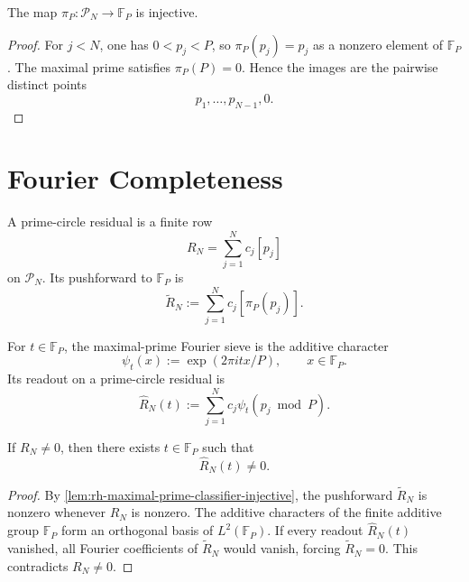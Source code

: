 \begin{lemma}
\label{lem:rh-maximal-prime-classifier-injective}
The map $\pi_P:\mathcal P_N\to\mathbb F_P$ is injective.
\end{lemma}

\begin{proof}
For $j<N$, one has $0<p_j<P$, so $\pi_P(p_j)=p_j$ as a nonzero element
of $\mathbb F_P$.  The maximal prime satisfies $\pi_P(P)=0$.  Hence the
images are the pairwise distinct points
$$
p_1,\ldots,p_{N-1},0.
$$
\end{proof}

\section{Fourier Completeness}
\label{sec:rh-finite-prime-circle-universe-fourier}

\begin{definition}
\label{def:rh-prime-circle-residual}
A prime-circle residual is a finite row
$$
R_N=\sum_{j=1}^{N}c_j[p_j]
$$
on $\mathcal P_N$.  Its pushforward to $\mathbb F_P$ is
$$
\widetilde R_N
:=
\sum_{j=1}^{N}c_j[\pi_P(p_j)].
$$
\end{definition}

\begin{definition}
\label{def:rh-maximal-prime-fourier-sieve}
For $t\in\mathbb F_P$, the maximal-prime Fourier sieve is the additive
character
$$
\psi_t(x):=\exp(2\pi i tx/P),
\qquad
x\in\mathbb F_P.
$$
Its readout on a prime-circle residual is
$$
\widehat R_N(t)
:=
\sum_{j=1}^{N}c_j\psi_t(p_j\bmod P).
$$
\end{definition}

\begin{theorem}
\label{thm:rh-finite-prime-circle-fourier-completeness}
If $R_N\ne0$, then there exists $t\in\mathbb F_P$ such that
$$
\widehat R_N(t)\ne0.
$$
\end{theorem}

\begin{proof}
By
\autoref{lem:rh-maximal-prime-classifier-injective}, the pushforward
$\widetilde R_N$ is nonzero whenever $R_N$ is nonzero.  The additive
characters of the finite additive group $\mathbb F_P$ form an
orthogonal basis of $L^2(\mathbb F_P)$.  If every readout
$\widehat R_N(t)$ vanished, all Fourier coefficients of
$\widetilde R_N$ would vanish, forcing $\widetilde R_N=0$.  This
contradicts $R_N\ne0$.
\end{proof}

